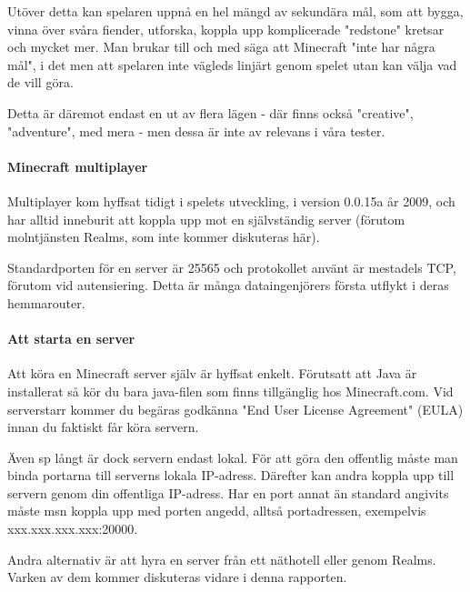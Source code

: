 \documentclass[journal,comsoc]{IEEEtran}
\begin{document}
Utöver detta kan spelaren uppnå en hel mängd av sekundära mål, som att bygga, vinna över svåra fiender, utforska, koppla upp komplicerade "redstone" kretsar och mycket mer. Man brukar till och med säga att Minecraft "inte har några mål", i det men att spelaren inte vägleds linjärt genom spelet utan kan välja vad de vill göra.

Detta är däremot endast en ut av flera lägen - där finns också "creative", "adventure", med mera - men dessa är inte av relevans i våra tester.


\paragraph{Minecraft multiplayer}
Multiplayer kom hyffsat tidigt i spelets utveckling, i version 0.0.15a år 2009, \cite{fanmcwiki:classic2009} och har alltid inneburit att koppla upp mot en självständig server (förutom molntjänsten Realms, som inte kommer diskuteras här).

Standardporten för en server är 25565 och protokollet använt är mestadels TCP, förutom vid autensiering. \cite{wikivg:minecraftprotocol} Detta är många dataingenjörers första utflykt i deras hemmarouter.

\paragraph{Att starta en server}
Att köra en Minecraft server själv är hyffsat enkelt. Förutsatt att Java är installerat så kör du bara java-filen som finns tillgänglig hos Minecraft.com. Vid serverstarr kommer du begäras godkänna "End User License Agreement" (EULA) innan du faktiskt får köra servern.

Även sp långt är dock servern endast lokal. För att göra den offentlig måste man binda portarna till serverns lokala IP-adress. Därefter kan andra koppla upp till servern genom din offentliga IP-adress. Har en port annat än standard angivits måste msn koppla upp med porten angedd, alltså portadressen, exempelvis xxx.xxx.xxx.xxx:20000.

Andra alternativ är att hyra en server från ett näthotell eller genom Realms. Varken av dem kommer diskuteras vidare i denna rapporten. 
\end{document}
